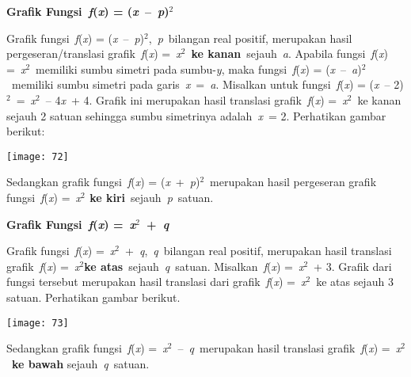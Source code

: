\documentclass[11pt,fleqn]{book} %
\begin{document}
\begin{myEnumerate}
\begin{itemize}
\noindent \textbf{Grafik Fungsi~\textit{f}(\textit{x}) = (\textit{x}~--~\textit{p})${}^{2}$}

\noindent Grafik fungsi~\textit{f}(\textit{x}) = (\textit{x}~--~\textit{p})${}^{2}$,~\textit{p}~bilangan real positif, merupakan hasil pergeseran/translasi grafik~\textit{f}(\textit{x}) =~\textit{x}${}^{2}$~\textbf{ke kanan}~sejauh~\textit{a}. Apabila fungsi~\textit{f}(\textit{x}) =~\textit{x}${}^{2}$~memiliki sumbu simetri pada sumbu-\textit{y}, maka fungsi~\textit{f}(\textit{x}) = (\textit{x}~--~\textit{a})${}^{2}$~memiliki sumbu simetri pada garis~\textit{x}~=~\textit{a}. Misalkan untuk fungsi~\textit{f}(\textit{x}) = (\textit{x}~-- 2)${}^{2}$~=~\textit{x}${}^{2}$~-- 4\textit{x}~+ 4. Grafik ini merupakan hasil translasi grafik~\textit{f}(\textit{x}) =~\textit{x}${}^{2}$~ke kanan sejauh 2 satuan sehingga sumbu simetrinya adalah~\textit{x}~= 2. Perhatikan gambar berikut:

\begin{center}
\noindent \texttt{[image: 72]}\textbf{}
\end{center}

\noindent Sedangkan grafik fungsi~\textit{f}(\textit{x}) = (\textit{x}~+~\textit{p})${}^{2}$~merupakan hasil pergeseran grafik fungsi~\textit{f}(\textit{x}) =~\textit{x}${}^{2}$ ${}^{ }$\textbf{ke kiri}~sejauh~\textit{p}~satuan.

\noindent \textbf{Grafik Fungsi~\textit{f}(\textit{x}) =~\textit{x}${}^{2}$~+~\textit{q}}

\noindent 

\noindent Grafik fungsi~\textit{f}(\textit{x}) =~\textit{x}${}^{2}$~+~\textit{q},~\textit{q}~bilangan real positif, merupakan hasil translasi grafik~\textit{f}(\textit{x}) =~\textit{x}${}^{2}$\textbf{ke atas}~sejauh~\textit{q}~satuan. Misalkan~\textit{f}(\textit{x}) =~\textit{x}${}^{2}$~+ 3. Grafik dari fungsi tersebut merupakan hasil translasi dari grafik~\textit{f}(\textit{x}) =~\textit{x}${}^{2}$~ke atas sejauh 3 satuan. Perhatikan gambar berikut.

\noindent 

\begin{center}
\noindent \texttt{[image: 73]}\textbf{}
\end{center}

\noindent Sedangkan grafik fungsi~\textit{f}(\textit{x}) =~\textit{x}${}^{2}$~--~\textit{q~}merupakan hasil translasi grafik~\textit{f}(\textit{x}) =~\textit{x}${}^{2}$~\textbf{ke bawah }sejauh~\textit{q}~satuan.


\end{itemize}
\end{myEnumerate}
\end{document}
